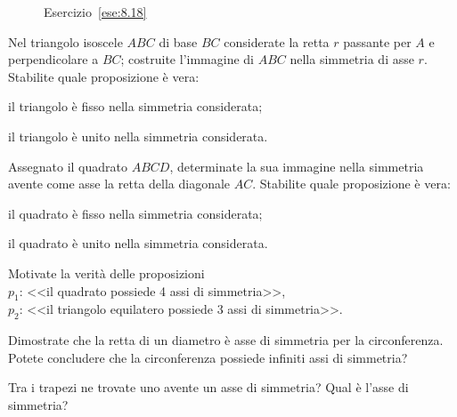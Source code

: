 \begin{inaccessibleblock}
 \begin{figure}[!htb]
  \centering
  \caption{Esercizio~\ref{ese:8.18}}\label{fig:ese8.18}
\end{figure}
\end{inaccessibleblock}

\begin{esercizio}
\label{ese:8.19}
Nel triangolo isoscele $ABC$ di base $BC$ considerate la retta $r$ 
passante per $A$ e perpendicolare a $BC$; costruite l'immagine di 
$ABC$ nella simmetria di asse $r$. Stabilite quale proposizione è 
vera:
\begin{enumeratea}
\item il triangolo è fisso nella simmetria considerata;
\item il triangolo è unito nella simmetria considerata.
\end{enumeratea}
\end{esercizio}

\begin{esercizio}
\label{ese:8.20}
Assegnato il quadrato $ABCD$, determinate la sua immagine nella 
simmetria avente come asse la retta della diagonale $AC$. Stabilite 
quale proposizione è vera:
\begin{enumeratea}
\item il quadrato è fisso nella simmetria considerata;
\item il quadrato è unito nella simmetria considerata.
\end{enumeratea}
\end{esercizio}

\begin{esercizio}
\label{ese:8.21}
Motivate la verità delle proposizioni\\
$p_1$: <<il quadrato possiede 4 assi di simmetria>>,\\
$p_2$: <<il triangolo equilatero possiede 3 assi di simmetria>>.
\end{esercizio}

\begin{esercizio}
\label{ese:8.22}
Dimostrate che la retta di un diametro è asse di simmetria per la 
circonferenza. Potete concludere che la circonferenza possiede 
infiniti assi di simmetria?
\end{esercizio}

\begin{esercizio}
\label{ese:8.23}
Tra i trapezi ne trovate uno avente un asse di simmetria? Qual è 
l'asse di simmetria? 
\end{esercizio}

